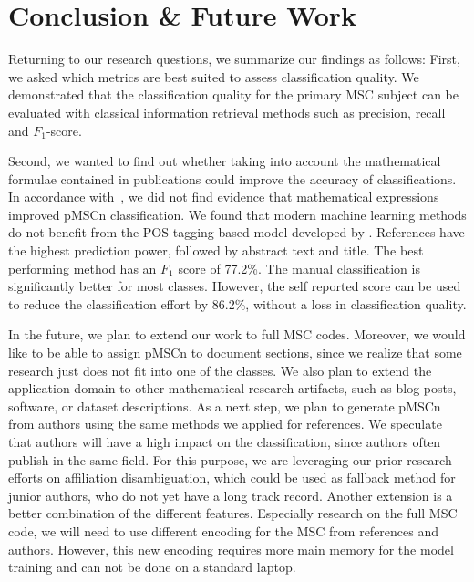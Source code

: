 \section{Conclusion \& Future Work}\label{sec.concl}
Returning to our research questions, we summarize our findings as follows:
First, we asked which metrics are best suited to assess classification quality.
We demonstrated that the classification quality for the primary MSC subject can be evaluated with classical information retrieval methods such as precision, recall and \(F_{1}\)-score.

Second, we wanted to find out whether taking into account the mathematical formulae contained in publications could improve the accuracy of classifications.
In accordance with~\cite{Scharpf2020}, we did not find evidence that mathematical expressions improved pMSCn classification. 
We found that modern machine learning methods do not benefit from the POS tagging based model developed by \cite{SchonebergS14}.
 References have the highest prediction power, followed by abstract text and title.
  The best performing method has an $F_1$ score of 77.2\%.
  The manual classification is significantly better for most classes. However, the self reported score can be used to reduce the classification effort by 86.2\%, without a loss in classification quality.

In the future, we plan to extend our work to full MSC codes.
Moreover, we would like to be able to assign pMSCn to document sections, since we realize that some research just does not fit into one of the classes.
We also plan to extend the application domain to other mathematical research artifacts, such as blog posts, software, or dataset descriptions.
As a next step, we plan to generate pMSCn from authors using the same methods we applied for references.
We speculate that authors will have a high impact on the classification, since authors often publish in the same field.
For this purpose, we are leveraging our prior research efforts on affiliation disambiguation, which could be used as fallback method for junior authors, who do not yet have a long track record.
Another extension is a better combination of the different features.
Especially research on the full MSC code, we will need to use different encoding for the MSC from references and authors.
However, this new encoding requires more main memory for the model training and can not be done on a standard laptop.

